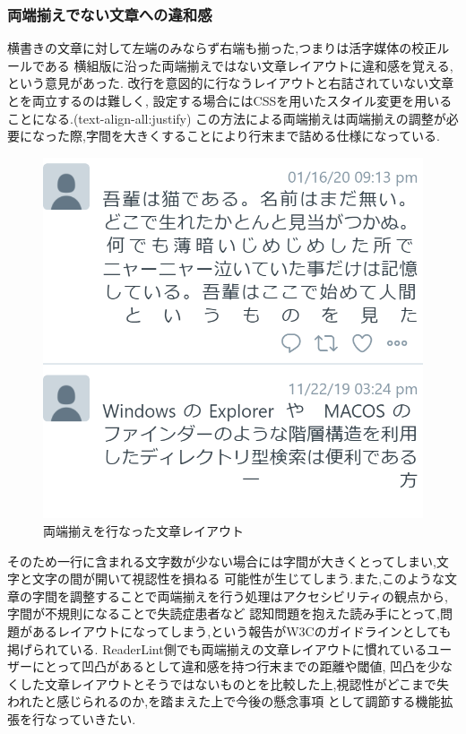 \subsubsection{両端揃えでない文章への違和感}
横書きの文章に対して左端のみならず右端も揃った,つまりは活字媒体の校正ルールである
横組版に沿った両端揃えではない文章レイアウトに違和感を覚える,という意見があった.
改行を意図的に行なうレイアウトと右詰されていない文章とを両立するのは難しく,
設定する場合にはCSSを用いたスタイル変更を用いることになる.(text-align-all:justify)
この方法による両端揃えは両端揃えの調整が必要になった際,字間を大きくすることにより行末まで詰める仕様になっている.
\begin{figure}[H]
    \centering
    \label{fig:ryohashi}
    \includegraphics[width=0.5\columnwidth]{image/04/img1.png}
    \caption[両端揃えを行なった文章レイアウト] {両端揃えを行なった文章レイアウト}
\end{figure}

そのため一行に含まれる文字数が少ない場合には字間が大きくとってしまい,文字と文字の間が開いて視認性を損ねる
可能性が生じてしまう.また,このような文章の字間を調整することで両端揃えを行う処理はアクセシビリティの観点から,字間が不規則になることで失読症患者など
認知問題を抱えた読み手にとって,問題があるレイアウトになってしまう,という報告がW3Cのガイドラインとしても掲げられている.\cite{WCAG2.0} 
ReaderLint側でも両端揃えの文章レイアウトに慣れているユーザーにとって凹凸があるとして違和感を持つ行末までの距離や閾値,
凹凸を少なくした文章レイアウトとそうではないものとを比較した上,視認性がどこまで失われたと感じられるのか,を踏まえた上で今後の懸念事項
として調節する機能拡張を行なっていきたい.

